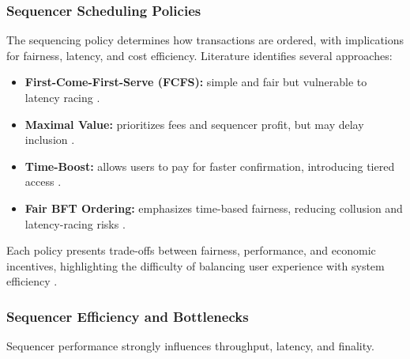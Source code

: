 \subsubsection{Sequencer Scheduling Policies}

The sequencing policy determines how transactions are ordered, with implications for fairness, latency, and cost efficiency. Literature identifies several approaches:
\vspace{12pt}

\begin{itemize}
    \item \textbf{First-Come-First-Serve (FCFS):} simple and fair but vulnerable to latency racing \cite{motepalli2023sok}.
    \item \textbf{Maximal Value:} prioritizes fees and sequencer profit, but may delay inclusion \cite{gogol2025scalingdefi}.
    \item  \textbf{Time-Boost:} allows users to pay for faster confirmation, introducing tiered access \cite{motepalli2023sok}.
    \item \textbf{Fair BFT Ordering:} emphasizes time-based fairness, reducing collusion and latency-racing risks \cite{motepalli2023sok}.
\end{itemize}
\vspace{12pt}
Each policy presents trade-offs between fairness, performance, and economic incentives, highlighting the difficulty of balancing user experience with system efficiency \cite{motepalli2023sok}.

\subsubsection{Sequencer Efficiency and Bottlenecks}

Sequencer performance strongly influences throughput, latency, and finality.
\vspace{12pt}


